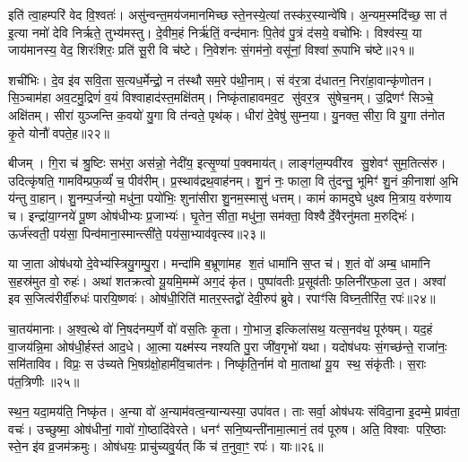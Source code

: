 इति॑ त्वा॒हम्परि॑ वेद वि॒श्वतः॑। असु॑न्वन्त॒मय॑जमानमिच्छ स्ते॒नस्ये॒त्यां तस्क॑र॒स्यान्वे॑षि। अ॒न्यम॒स्मदि॑च्छ॒ सा त॑ इ॒त्या नमो॑ देवि निर्\mbox{}ऋते॒ तुभ्य॑मस्तु। दे॒वीम॒हं निर्\mbox{}ऋ॑तिं॒ वन्द॑मानः पि॒तेव॑ पु॒त्रं द॑सये॒ वचो॑भिः। विश्व॑स्य॒ या जाय॑मानस्य॒ वेद॒ शिरः॑शिरः॒ प्रति॑ सू॒री वि च॑ष्टे। नि॒वेश॑नः सं॒गम॑नो॒ वसू॑नां॒ विश्वा॑ रू॒पाभि च॑ष्टे॥२१॥

शची॑भिः। दे॒व इ॑व सवि॒ता स॒त्यध॒र्मेन्द्रो॒ न त॑स्थौ सम॒रे प॑थी॒नाम्। सं व॑र॒त्रा द॑धातन॒ निरा॑हा॒वान्कृ॑णोतन। सि॒ञ्चाम॑हा अव॒टमु॒द्रिणं॑ व॒यं विश्वाहाद॑स्त॒मक्षि॑तम्। निष्कृ॑ताहावमव॒ट सु॑वर॒त्र सु॑षेच॒नम्। उ॒द्रिणꣳ॑ सिञ्चे॒ अक्षि॑तम्। सीरा॑ युञ्जन्ति क॒वयो॑ यु॒गा वि त॑न्वते॒ पृथ॑क्। धीरा॑ दे॒वेषु॑ सुम्न॒या। यु॒नक्त॒ सीरा॒ वि यु॒गा त॑नोत कृ॒ते योनौ॑ वपते॒ह॥२२॥

बीजम्। गि॒रा च॑ श्रु॒ष्टिः सभ॑रा॒ अस॑न्नो॒ नेदी॑य॒ इत्सृ॒ण्या॑ प॒क्वमाय॑त्। लाङ्ग॑ल॒म्पवी॑रव सु॒शेवꣳ॑ सुम॒तित्स॑रु। उदित्कृ॑षति॒ गामवि॑म्प्रफ॒र्व्यं॑ च॒ पीव॑रीम्। प्र॒स्थाव॑द्रथ॒वाह॑नम्। शु॒नं नः॒ फाला॒ वि तु॑दन्तु॒ भूमिꣳ॑ शु॒नं की॒नाशा॑ अ॒भि य॑न्तु वा॒हान्। शु॒नम्प॒र्जन्यो॒ मधु॑ना॒ पयो॑भिः॒ शुना॑सीरा शु॒नम॒स्मासु॑ धत्तम्। कामं॑ कामदुघे धुक्ष्व मि॒त्राय॒ वरु॑णाय च। इन्द्रा॑या॒ग्नये॑ पू॒ष्ण ओष॑धीभ्यः प्र॒जाभ्यः॑। घृ॒तेन॒ सीता॒ मधु॑ना॒ सम॑क्ता॒ विश्वैर्दे॒वैरनु॑मता म॒रुद्भिः॑। ऊर्ज॑स्वती॒ पय॑सा॒ पिन्व॑माना॒स्मान्त्सी॑ते॒ पय॑सा॒भ्याव॑वृत्स्व॥२३॥

{\anuvakamend[{समो॑कसौ विश्वरूपे वि॒दुर्निर्\mbox{}ऋ॑तिर॒भि च॑ष्ट इ॒ह मि॒त्राय॒ द्वाविꣳ॑शतिश्च॥५॥}]}

या जा॒ता ओष॑धयो दे॒वेभ्य॑स्त्रियु॒गम्पु॒रा। मन्दा॑मि ब॒भ्रूणा॑मह श॒तं धामा॑नि स॒प्त च॑। श॒तं वो॑ अम्ब॒ धामा॑नि स॒हस्र॑मुत वो॒ रुहः॑। अथा॑ शतक्रत्वो यू॒यमि॒मम्मे॑ अग॒दं कृ॑त। पुष्पा॑वतीः प्र॒सूव॑तीः फ॒लिनी॑रफ॒ला उ॒त। अश्वा॑ इव स॒जित्व॑रीर्वी॒रुधः॑ पारयि॒ष्णवः॑। ओष॑धी॒रिति॑ मातर॒स्तद्वो॑ देवी॒रुप॑ ब्रुवे। रपाꣳ॑सि विघ्न॒तीरि॑त॒ रपः॑॥२४॥

चा॒तय॑मानाः। अ॒श्व॒त्थे वो॑ नि॒षद॑नम्प॒र्णे वो॑ वस॒तिः कृ॒ता। गो॒भाज॒ इत्किला॑सथ॒ यत्स॒नव॑थ॒ पूरु॑षम्। यद॒हं वा॒जय॑न्नि॒मा ओष॑धी॒र्\mbox{}हस्त॑ आद॒धे। आ॒त्मा यक्ष्म॑स्य नश्यति पु॒रा जी॑व॒गृभो॑ यथा। यदोष॑धयः सं॒गच्छ॑न्ते॒ राजा॑नः॒ समि॑ताविव। विप्रः॒ स उ॑च्यते भि॒षग्र॑क्षो॒हामी॑व॒चात॑नः। निष्कृ॑ति॒र्नाम॑ वो मा॒ताथा॑ यू॒य स्थ॒ संकृ॑तीः। स॒राः प॑त॒त्रिणीः॥२५॥

स्थ॒न॒ यदा॒मय॑ति॒ निष्कृ॑त। अ॒न्या वो॑ अ॒न्याम॑वत्व॒न्यान्यस्या॒ उपा॑वत। ताः सर्वा॒ ओष॑धयः संविदा॒ना इ॒दम्मे॒ प्राव॑ता॒ वचः॑। उच्छुष्मा॒ ओष॑धीनां॒ गावो॑ गो॒ष्ठादि॑वेरते। धनꣳ॑ सनि॒ष्यन्ती॑नामा॒त्मानं॒ तव॑ पूरुष। अति॒ विश्वाः परि॒ष्ठाः स्ते॒न इ॑व व्र॒जम॑क्रमुः। ओष॑धयः॒ प्राचु॑च्यवु॒र्यत् किं च॑ त॒नुवा॒ꣳ॒ रपः॑। याः॥२६॥

